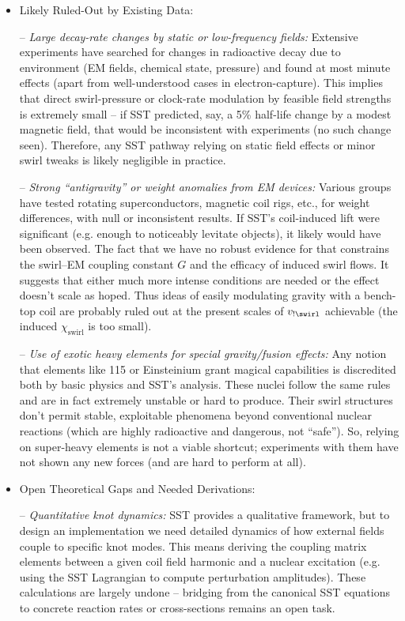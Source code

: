 \documentclass[11pt]{article}
\begin{document}
\begin{itemize}
\item 
Likely Ruled-Out by Existing Data:

– \textit{Large decay-rate changes by static or low-frequency fields:} Extensive experiments have searched for changes in radioactive decay due to environment (EM fields, chemical state, pressure) and found at most minute effects (apart from well-understood cases in electron-capture). This implies that direct swirl-pressure or clock-rate modulation by feasible field strengths is extremely small – if SST predicted, say, a 5\% half-life change by a modest magnetic field, that would be inconsistent with experiments (no such change seen). Therefore, any SST pathway relying on static field effects or minor swirl tweaks is likely negligible in practice.

– \textit{Strong “antigravity” or weight anomalies from EM devices:} Various groups have tested rotating superconductors, magnetic coil rigs, etc., for weight differences, with null or inconsistent results. If SST’s coil-induced lift were significant (e.g. enough to noticeably levitate objects), it likely would have been observed. The fact that we have no robust evidence for that constrains the swirl–EM coupling constant $G$ and the efficacy of induced swirl flows. It suggests that either much more intense conditions are needed or the effect doesn’t scale as hoped. Thus ideas of easily modulating gravity with a bench-top coil are probably ruled out at the present scales of $v_{!\swirl}$ achievable (the induced $\chi_{\text{swirl}}$ is too small).

– \textit{Use of exotic heavy elements for special gravity/fusion effects:} Any notion that elements like 115 or Einsteinium grant magical capabilities is discredited both by basic physics and SST’s analysis. These nuclei follow the same rules and are in fact extremely unstable or hard to produce. Their swirl structures don’t permit stable, exploitable phenomena beyond conventional nuclear reactions (which are highly radioactive and dangerous, not “safe”). So, relying on super-heavy elements is not a viable shortcut; experiments with them have not shown any new forces (and are hard to perform at all).




\item 
Open Theoretical Gaps and Needed Derivations:

– \textit{Quantitative knot dynamics:} SST provides a qualitative framework, but to design an implementation we need detailed dynamics of how external fields couple to specific knot modes. This means deriving the coupling matrix elements between a given coil field harmonic and a nuclear excitation (e.g. using the SST Lagrangian to compute perturbation amplitudes). These calculations are largely undone – bridging from the canonical SST equations to concrete reaction rates or cross-sections remains an open task.


\end{itemize}
\end{document}
